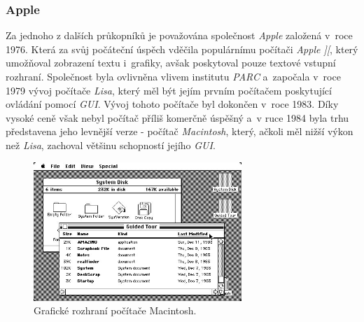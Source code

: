 \documentclass[11pt,twoside,a4paper]{book}
\begin{document}
\subsubsection{Apple}
Za jednoho z dalších průkopníků je považována společnost \textit{Apple} založená v~roce 1976. Která za svůj počáteční úspěch vděčila populárnímu počítači \textit{Apple ][}, který umožňoval zobrazení textu i~grafiky, avšak poskytoval pouze textové vstupní rozhraní. Společnost byla ovlivněna vlivem institutu \textit{PARC} a~započala v~roce 1979 vývoj počítače \textit{Lisa}, který měl být jejím prvním počítačem poskytující ovládání pomocí \textit{GUI}. Vývoj tohoto počítače byl dokončen v~roce 1983. Díky vysoké ceně však nebyl počítač příliš komerčně úspěšný a~v ruce 1984 byla trhu představena jeho levnější verze - počítač \textit{Macintosh}, který, ačkoli měl nižší výkon než \textit{Lisa}, zachoval většinu schopností jejího \textit{GUI}.
\begin{figure}[!ht]
\begin{center}
  \includegraphics[width=0.7\textwidth]{mac}
\caption{{\label{fig:macGUI}}Grafické rozhraní počítače Macintosh.}
\end{center}
\end{figure}
\end{document}
